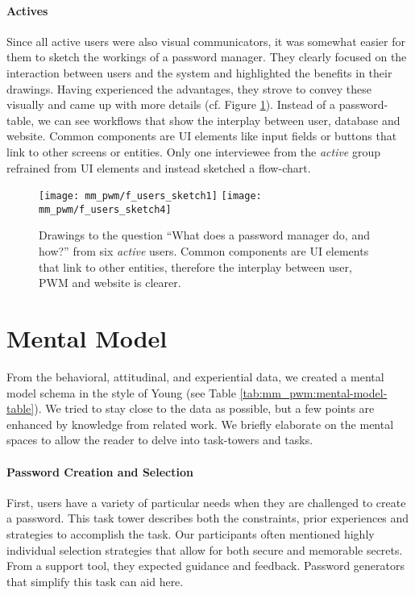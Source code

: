 \paragraph{Actives} Since all active users were also visual communicators, it was somewhat easier for them to sketch the workings of a password manager. They clearly focused on the interaction between users and the system and highlighted the benefits in their drawings. Having experienced the advantages, they strove to convey these visually and came up with more details (cf. Figure \ref{fig:mm_pwm:f_actives_sketch1}). Instead of a password-table, we can see workflows that show the interplay between user, database and website. Common components are UI elements like input fields
or buttons that link to other screens or entities. Only one interviewee from the \textit{active} group refrained from UI elements and instead sketched a flow-chart. 
\begin{figure}
	\centering
	\texttt{[image: mm\_pwm/f\_users\_sketch1]}
	\texttt{[image: mm\_pwm/f\_users\_sketch4]}
	\caption{\label{fig:mm_pwm:f_actives_sketch1} Drawings to the question ``What does a password manager do, and how?'' from six \textit{active} users. Common components are UI elements that link to other entities, therefore the interplay between user, PWM and website is clearer.}
\end{figure}

\section{Mental Model}\label{ref:mm_pwm:mm-description}
From the behavioral, attitudinal, and experiential data, we created a mental model schema in the style of Young \cite{Young2008} (see Table \ref{tab:mm_pwm:mental-model-table}). We tried to stay close to the data as possible, but a few points are enhanced by knowledge from related work. We briefly elaborate on the mental spaces to allow the reader to delve into task-towers and tasks. 

\paragraph{Password Creation and Selection}
First, users have a variety of particular needs when they are challenged to create a password. This task tower describes both the constraints, prior experiences and strategies to accomplish the task. Our participants often mentioned highly individual selection strategies that allow for both secure and memorable secrets. From a support tool, they expected guidance and feedback. Password generators that simplify this task can aid here. 

